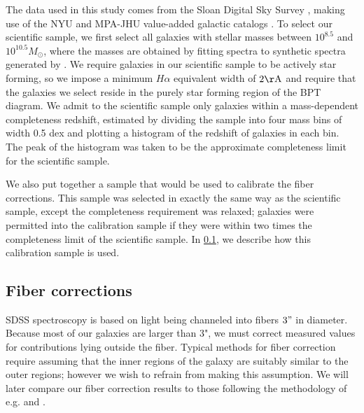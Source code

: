 \documentclass[iop]{emulateapj}
\begin{document}
The data used in this study comes from the Sloan Digital Sky Survey \citep[SDSS,][]{SDSS}, making use of the NYU and MPA-JHU value-added galactic catalogs \citep{Kauffmann03,Brinchmann04,blanton05vagc}. To select our scientific sample, we first select all galaxies with stellar masses between $10^{8.5}$ and $10^{10.5} M_{\odot}$, where the masses are obtained by fitting spectra to synthetic spectra generated by \cite{BC03}. We require galaxies in our scientific sample to be actively star forming, so we impose a minimum $H\alpha$ equivalent width of $2 \rm \AA$ and require that the galaxies we select reside in the purely star forming region of the BPT diagram. We admit to the scientific sample only galaxies within a mass-dependent completeness redshift, estimated by dividing the sample into four mass bins of width 0.5 dex and plotting a histogram of the redshift of galaxies in each bin. The peak of the histogram was taken to be the approximate completeness limit for the scientific sample.

We also put together a sample that would be used to calibrate the fiber corrections. This sample was selected in exactly the same way as the scientific sample, except the completeness requirement was relaxed; galaxies were permitted into the calibration sample if they were within two times the completeness limit of the scientific sample. In \ref{sec:fibercor}, we describe how this calibration sample is used.

\subsection{Fiber corrections}
\label{sec:fibercor}
SDSS spectroscopy is based on light being channeled into fibers $3"$ in diameter. Because most of our galaxies are larger than 3", we must correct measured values for contributions lying outside the fiber. Typical methods for fiber correction require assuming that the inner regions of the galaxy are suitably similar to the outer regions; however we wish to refrain from making this assumption. We will later compare our fiber correction results to those following the methodology of e.g. \cite{Brinchmann04} and \cite{Salim07}.
\end{document}
